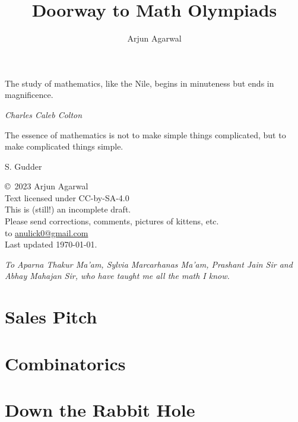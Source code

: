 \documentclass{maaprb}
\title{Doorway to Math Olympiads}
\author{Arjun Agarwal}
\begin{document}
\frontmatter
\maketitle
\epigraph{The study of mathematics, like the Nile, begins in minuteness but ends in magnificence.}{\textit{Charles Caleb Colton}}
\epigraph{The essence of mathematics is not to make simple things complicated, but to make complicated things simple.}{S. Gudder}
\pagebreak

\begin{center}
\copyright\ 2023 Arjun Agarwal \\
Text licensed under CC-by-SA-4.0 \\
This is (still!) an incomplete draft. \\
Please send corrections, comments, pictures of kittens, etc. \\
to \href{mailto:anulick0@gmail.com}{anulick0@gmail.com} \\
Last updated \today.
\end{center}
\pagebreak

\thispagestyle{empty}
\vspace*{13.5pc}
\begin{center}
{\em To Aparna Thakur Ma'am, Sylvia Marcarhanas Ma'am, Prashant Jain Sir and Abhay Mahajan Sir, who have taught me all the math I know.} 
\end{center}
\pagebreak

\tableofcontents





\mainmatter
\part{Sales Pitch}


\part{Combinatorics}






\part{Down the Rabbit Hole}




\end{document}
